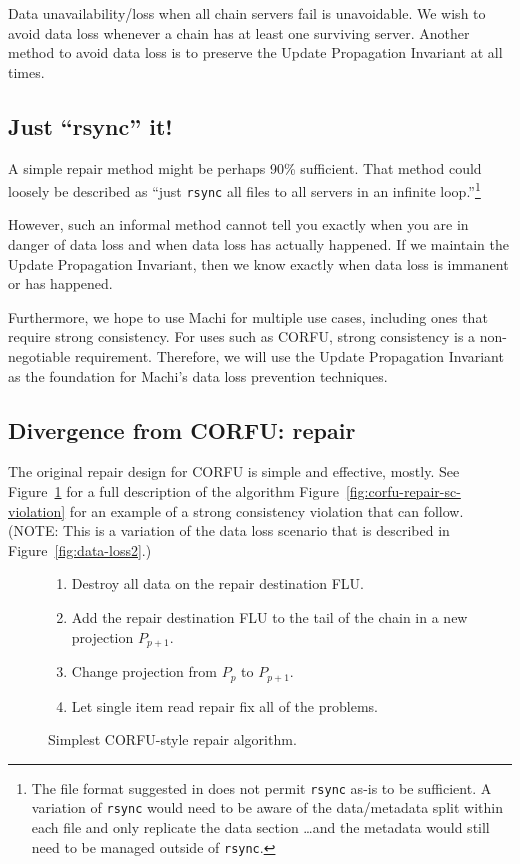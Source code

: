 \documentclass[preprint,10pt]{sigplanconf}
\begin{document}
Data
unavailability/loss when all chain servers fail is unavoidable.  We
wish to avoid data loss whenever a chain has at least one surviving
server.  Another method to avoid data loss is to preserve the Update
Propagation Invariant at all times.

\subsection{Just ``rsync'' it!}
\label{ssec:just-rsync-it}

A simple repair method might be perhaps 90\% sufficient.
That method could loosely be described as ``just {\tt rsync}
all files to all servers in an infinite loop.''\footnote{The
  file format suggested in
  \cite{machi-design} does not permit {\tt rsync}
  as-is to be sufficient.  A variation of {\tt rsync} would need to be
  aware of the data/metadata split within each file and only replicate
  the data section \ldots and the metadata would still need to be
  managed outside of {\tt rsync}.}

However, such an informal method
cannot tell you exactly when you are in danger of data loss and when
data loss has actually happened.  If we maintain the Update
Propagation Invariant, then we know exactly when data loss is immanent
or has happened.

Furthermore, we hope to use Machi for multiple use cases, including
ones that require strong consistency.
For uses such as CORFU, strong consistency is a non-negotiable
requirement.  Therefore, we will use the Update Propagation Invariant
as the foundation for Machi's data loss prevention techniques.

\subsection{Divergence from CORFU: repair}
\label{sub:repair-divergence}

The original repair design for CORFU is simple and effective,
mostly.  See Figure~\ref{fig:corfu-style-repair} for a full
description of the algorithm
Figure~\ref{fig:corfu-repair-sc-violation} for an example of a strong
consistency violation that can follow.  (NOTE: This is a variation of
the data loss scenario that is described in
Figure~\ref{fig:data-loss2}.)

\begin{figure}
\begin{enumerate}
\item Destroy all data on the repair destination FLU.
\item Add the repair destination FLU to the tail of the chain in a new
  projection $P_{p+1}$.
\item Change projection from $P_p$ to $P_{p+1}$.
\item Let single item read repair fix all of the problems.
\end{enumerate}
\caption{Simplest CORFU-style repair algorithm.}
\label{fig:corfu-style-repair}
\end{figure}
\end{document}
